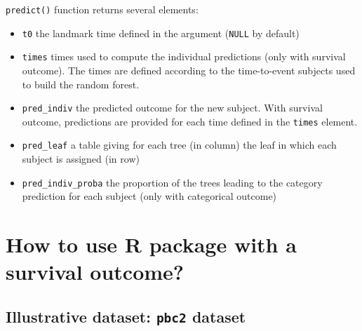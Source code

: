 \texttt{predict()} function returns several elements:

\begin{itemize}
\tightlist
\item
  \texttt{t0} the landmark time defined in the argument (\texttt{NULL} by default)
\item
  \texttt{times} times used to compute the individual predictions (only with survival outcome). The times are defined according to the time-to-event subjects used to build the random forest.
\item
  \texttt{pred\_indiv} the predicted outcome for the new subject. With survival outcome, predictions are provided for each time defined in the \texttt{times} element.
\item
  \texttt{pred\_leaf} a table giving for each tree (in column) the leaf in which each subject is assigned (in row)
\item
  \texttt{pred\_indiv\_proba} the proportion of the trees leading to the category prediction for each subject (only with categorical outcome)
\end{itemize}

\section{\texorpdfstring{How to use  R package with a survival outcome?}{How to use  R package with a survival outcome?}}\label{sec:dynforestR_surv}

\subsection{\texorpdfstring{Illustrative dataset: \texttt{pbc2} dataset}{Illustrative dataset: pbc2 dataset}}\label{illustrative-dataset-pbc2-dataset}

